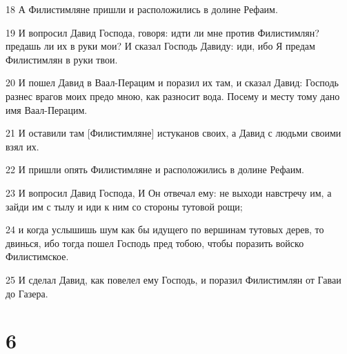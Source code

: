 \par 18 А Филистимляне пришли и расположились в долине Рефаим.
\par 19 И вопросил Давид Господа, говоря: идти ли мне против Филистимлян? предашь ли их в руки мои? И сказал Господь Давиду: иди, ибо Я предам Филистимлян в руки твои.
\par 20 И пошел Давид в Ваал-Перацим и поразил их там, и сказал Давид: Господь разнес врагов моих предо мною, как разносит вода. Посему и месту тому дано имя Ваал-Перацим.
\par 21 И оставили там [Филистимляне] истуканов своих, а Давид с людьми своими взял их.
\par 22 И пришли опять Филистимляне и расположились в долине Рефаим.
\par 23 И вопросил Давид Господа, И Он отвечал ему: не выходи навстречу им, а зайди им с тылу и иди к ним со стороны тутовой рощи;
\par 24 и когда услышишь шум как бы идущего по вершинам тутовых дерев, то двинься, ибо тогда пошел Господь пред тобою, чтобы поразить войско Филистимское.
\par 25 И сделал Давид, как повелел ему Господь, и поразил Филистимлян от Гаваи до Газера.

\chapter{6}

